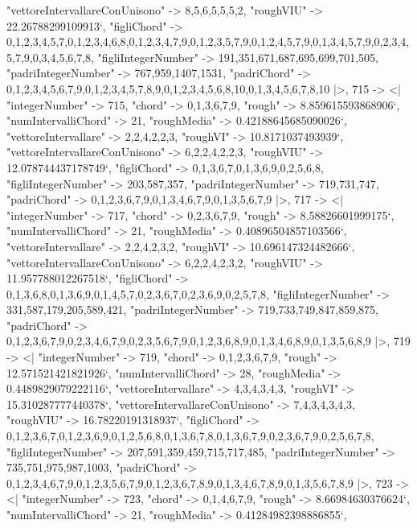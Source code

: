 \documentclass[
]{article}
\begin{document}
\begin{DatasetVerbatim}
    "vettoreIntervallareConUnisono" -> {8,5,6,5,5,5,2},
    "roughVIU" -> 22.26788299109913`,
    "figliChord" -> {{0,1,2,3,4,5,7},{0,1,2,3,4,6,8},{0,1,2,3,4,7,9},{0,1,2,3,5,7,9},{0,1,2,4,5,7,9},{0,1,3,4,5,7,9},{0,2,3,4,5,7,9},{0,3,4,5,6,7,8}},
    "figliIntegerNumber" -> {191,351,671,687,695,699,701,505},
    "padriIntegerNumber" -> {767,959,1407,1531},
    "padriChord" -> {{0,1,2,3,4,5,6,7,9},{0,1,2,3,4,5,7,8,9},{0,1,2,3,4,5,6,8,10},{0,1,3,4,5,6,7,8,10}}
  |>,
  715 -> <|
    "integerNumber" -> 715,
    "chord" -> {0,1,3,6,7,9},
    "rough" -> 8.859615593868906`,
    "numIntervalliChord" -> 21,
    "roughMedia" -> 0.42188645685090026`,
    "vettoreIntervallare" -> {2,2,4,2,2,3},
    "roughVI" -> 10.8171037493939`,
    "vettoreIntervallareConUnisono" -> {6,2,2,4,2,2,3},
    "roughVIU" -> 12.078744437178749`,
    "figliChord" -> {{0,1,3,6,7},{0,1,3,6,9},{0,2,5,6,8}},
    "figliIntegerNumber" -> {203,587,357},
    "padriIntegerNumber" -> {719,731,747},
    "padriChord" -> {{0,1,2,3,6,7,9},{0,1,3,4,6,7,9},{0,1,3,5,6,7,9}}
  |>,
  717 -> <|
    "integerNumber" -> 717,
    "chord" -> {0,2,3,6,7,9},
    "rough" -> 8.58826601999175`,
    "numIntervalliChord" -> 21,
    "roughMedia" -> 0.40896504857103566`,
    "vettoreIntervallare" -> {2,2,4,2,3,2},
    "roughVI" -> 10.696147324482666`,
    "vettoreIntervallareConUnisono" -> {6,2,2,4,2,3,2},
    "roughVIU" -> 11.957788012267518`,
    "figliChord" -> {{0,1,3,6,8},{0,1,3,6,9},{0,1,4,5,7},{0,2,3,6,7},{0,2,3,6,9},{0,2,5,7,8}},
    "figliIntegerNumber" -> {331,587,179,205,589,421},
    "padriIntegerNumber" -> {719,733,749,847,859,875},
    "padriChord" -> {{0,1,2,3,6,7,9},{0,2,3,4,6,7,9},{0,2,3,5,6,7,9},{0,1,2,3,6,8,9},{0,1,3,4,6,8,9},{0,1,3,5,6,8,9}}
  |>,
  719 -> <|
    "integerNumber" -> 719,
    "chord" -> {0,1,2,3,6,7,9},
    "rough" -> 12.571521421821926`,
    "numIntervalliChord" -> 28,
    "roughMedia" -> 0.4489829079222116`,
    "vettoreIntervallare" -> {4,3,4,3,4,3},
    "roughVI" -> 15.310287777440378`,
    "vettoreIntervallareConUnisono" -> {7,4,3,4,3,4,3},
    "roughVIU" -> 16.78220191318937`,
    "figliChord" -> {{0,1,2,3,6,7},{0,1,2,3,6,9},{0,1,2,5,6,8},{0,1,3,6,7,8},{0,1,3,6,7,9},{0,2,3,6,7,9},{0,2,5,6,7,8}},
    "figliIntegerNumber" -> {207,591,359,459,715,717,485},
    "padriIntegerNumber" -> {735,751,975,987,1003},
    "padriChord" -> {{0,1,2,3,4,6,7,9},{0,1,2,3,5,6,7,9},{0,1,2,3,6,7,8,9},{0,1,3,4,6,7,8,9},{0,1,3,5,6,7,8,9}}
  |>,
  723 -> <|
    "integerNumber" -> 723,
    "chord" -> {0,1,4,6,7,9},
    "rough" -> 8.66984630376624`,
    "numIntervalliChord" -> 21,
    "roughMedia" -> 0.41284982398886855`,

\end{DatasetVerbatim}
\end{document}
